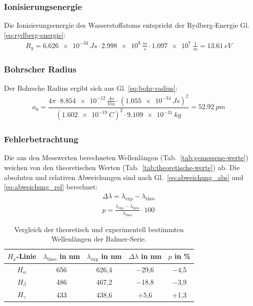 \subsubsection*{Ionisierungsenergie}
Die Ionisierungsenergie des Wasserstoffatoms entspricht der Rydberg-Energie Gl. \eqref{eq:rydberg-energie}:
\begin{align}
  R_y = \SI{6,626e-34}{Js} \cdot \SI{2,998e8}{\frac{m}{s}} \cdot \SI{1,097e7}{\frac{1}{m}} = \SI{13,61}{eV}
\end{align}

\subsubsection*{Bohrscher Radius}
Der Bohrsche Radius ergibt sich aus Gl. \eqref{eq:bohr-radius}:
\begin{align}
  a_{0}= \dfrac{4\pi \cdot \SI{8,854e-12}{\frac{As}{Vm}} \cdot (\SI{1,055e-34}{J s})^{2}}{(\SI{1,602e-19}{C})^{2}\cdot\SI{9,109e-31}{kg}} = \SI{52,92}{pm}
\end{align}


\subsubsection{Fehlerbetrachtung}
Die aus den Messwerten berechneten Wellenlängen (Tab.~\ref{tab:gemessene-werte}) weichen von den theoretischen Werten (Tab.~\ref{tab:theoretische-werte}) ab. Die absoluten und relativen Abweichungen sind nach Gl.~\eqref{eq:abweichung_abs} und \eqref{eq:abweichung_rel} berechnet:
\begin{align}
  \Delta \lambda  = \lambda_{\text{exp}} - \lambda_{\text{theo}}
  \label{eq:abweichung_abs} \\
  p               = \frac{\lambda_{\text{exp}} - \lambda_{\text{theo}}}{\lambda_{\text{theo}}} \cdot 100
  \label{eq:abweichung_rel}
\end{align}

\begin{table}[H]
  \centering
  \caption{Vergleich der theoretisch und experimentell bestimmten Wellenlängen der Balmer-Serie.}
  \begin{tabular}{c|cccc}
    \hline
    $H_{x}$-Linie & $\lambda_{\text{theo}}$ in \si{nm} & $\lambda_{\text{exp}}$ in \si{nm} & $\Delta\lambda$ in \si{nm} & $p$ in \si{\percent} \\
    \hline
    $H_{\alpha}$  & 656                                & 626{,}4                           & $-$29{,}6                  & $-$4{,}5             \\
    $H_{\beta}$   & 486                                & 467{,}2                           & $-$18{,}8                  & $-$3{,}9             \\
    $H_{\gamma}$  & 433                                & 438{,}6                           & $+$5{,}6                   & $+$1{,}3             \\
    \hline
  \end{tabular}
\end{table}


